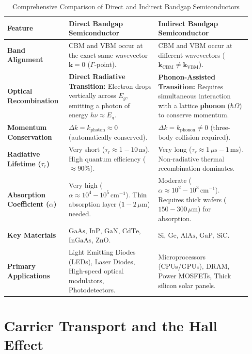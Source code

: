 \begin{table}[htbp]
\centering
\small
\caption{Comprehensive Comparison of Direct and Indirect Bandgap Semiconductors}
\label{tab:ch1_direct_indirect}
\begin{tabularx}{\textwidth}{p{3.2cm}XX}
\toprule
\textbf{Feature} & \textbf{Direct Bandgap Semiconductor} & \textbf{Indirect Bandgap Semiconductor} \\
\midrule
\textbf{Band Alignment} & CBM and VBM occur at the exact same wavevector $\mathbf{k} = 0$ ($\Gamma$-point). & CBM and VBM occur at different wavevectors ($\mathbf{k}_{\text{CBM}} \neq \mathbf{k}_{\text{VBM}}$). \\
\textbf{Optical Recombination} & \textbf{Direct Radiative Transition:} Electron drops vertically across $E_g$, emitting a photon of energy $h\nu \approx E_g$. & \textbf{Phonon-Assisted Transition:} Requires simultaneous interaction with a lattice \textbf{phonon} ($\hbar\Omega$) to conserve momentum. \\
\textbf{Momentum Conservation} & $\Delta k = k_{\text{photon}} \approx 0$ (automatically conserved). & $\Delta k = k_{\text{phonon}} \neq 0$ (three-body collision required). \\
\textbf{Radiative Lifetime ($\tau_r$)} & Very short ($\tau_r \approx 1-10\,\text{ns}$). High quantum efficiency ($\approx 90\%$). & Very long ($\tau_r \approx 1\,\mu\text{s}-1\,\text{ms}$). Non-radiative thermal recombination dominates. \\
\textbf{Absorption Coefficient ($\alpha$)} & Very high ($\alpha \approx 10^4-10^5\,\text{cm}^{-1}$). Thin absorption layer ($1-2\,\mu\text{m}$) needed. & Moderate ($\alpha \approx 10^2-10^3\,\text{cm}^{-1}$). Requires thick wafers ($150-300\,\mu\text{m}$) for absorption. \\
\textbf{Key Materials} & $\text{GaAs}$, $\text{InP}$, $\text{GaN}$, $\text{CdTe}$, $\text{InGaAs}$, $\text{ZnO}$. & $\text{Si}$, $\text{Ge}$, $\text{AlAs}$, $\text{GaP}$, $\text{SiC}$. \\
\textbf{Primary Applications} & Light Emitting Diodes (LEDs), Laser Diodes, High-speed optical modulators, Photodetectors. & Microprocessors (CPUs/GPUs), DRAM, Power MOSFETs, Thick silicon solar panels. \\
\bottomrule
\end{tabularx}
\end{table}

\section{Carrier Transport and the Hall Effect}
